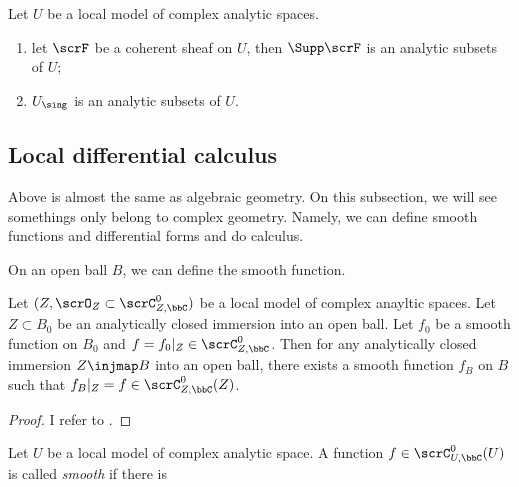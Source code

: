 \begin{proposition}
	Let $U$ be a local model of complex analytic spaces.
	\begin{enumerate}
		\item let $\scrF$ be a coherent sheaf on $U$, then $\Supp \scrF$ is an analytic subsets of $U$;
		\item $U_\sing$ is an analytic subsets of $U$.
	\end{enumerate}
	\Yang{}
\end{proposition}




\subsection{Local differential calculus}

Above is almost the same as algebraic geometry.
On this subsection, we will see somethings only belong to complex geometry.
Namely, we can define smooth functions and differential forms and do calculus.

On an open ball $B$, we can define the smooth function. \Yang{}

\begin{lemma}
	Let $(Z,\scrO_Z \subset \scrC_{Z,\bbC}^0)$ be a local model of complex anayltic spaces.
	Let $Z \subset B_0$ be an analytically closed immersion into an open ball.
	Let $f_0$ be a smooth function on $B_0$ and $f = f_0|_Z \in \scrC^0_{Z,\bbC}$.
	Then for any analytically closed immersion $Z \injmap B$ into an open ball, there exists a smooth function $f_B$ on $B$ such that $f_B|_Z = f \in \scrC_{Z,\bbC}^0(Z)$.
\end{lemma}
\begin{proof}
	I refer to \cite[Section 3.2.4]{Barlet-Magnusson-2019-ComplexAnalyticCycles}.
	\Yang{}
\end{proof}

\begin{definition}
	Let $U$ be a local model of complex analytic space.
	A function $f \in \scrC^0_{U,\bbC}(U)$ is called \emph{smooth} if there is
	\Yang{}
\end{definition}

